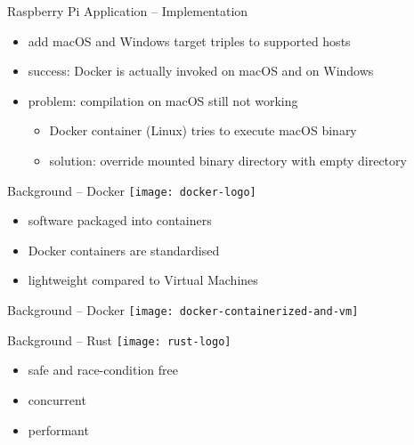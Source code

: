 \documentclass[aspectratio=1610]{beamer}
\newcommand\green[1]{{\color{green(ncs)}#1}}
\newcommand\red[1]{{\color{amaranth}#1}}
\begin{document}
  \begin{frame}{Raspberry Pi Application -- Implementation}
    \begin{itemize}
      \item add macOS and Windows target triples to supported hosts
      \item \green{success:} Docker is actually invoked on macOS and on Windows
      \item \red{problem:} compilation on macOS still not working
         \begin{itemize}
           \item Docker container (Linux) tries to execute macOS binary
           \item \green{solution:} override mounted binary directory with empty directory
         \end{itemize}
    \end{itemize}
  \end{frame}

  \begin{frame}{Background -- Docker}
    \texttt{[image: docker-logo]}

    \vspace*{1.5em}

    \begin{itemize}
      \item software packaged into containers
      \item Docker containers are standardised
      \item lightweight compared to Virtual Machines
    \end{itemize}
  \end{frame}

  \begin{frame}{Background -- Docker}
    \vfill
    \texttt{[image: docker-containerized-and-vm]}
  \end{frame}

  \begin{frame}{Background -- Rust}
    \texttt{[image: rust-logo]}

    \vspace*{1.5em}

    \begin{itemize}
      \item safe and race-condition free
      \item concurrent
      \item performant
    \end{itemize}
  \end{frame}
\end{document}
